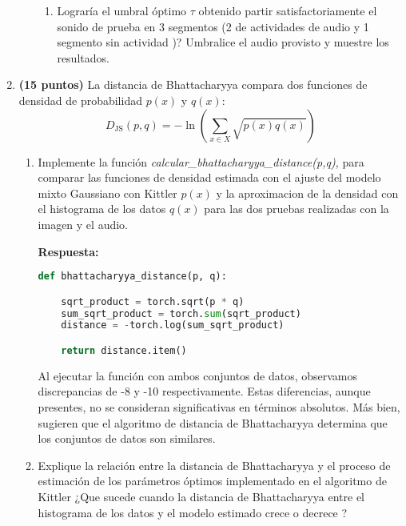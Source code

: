 \documentclass[spanish]{article}
\begin{document}
\begin{enumerate}
\begin{enumerate}
\begin{enumerate}
\item Lograría el umbral óptimo $\tau$ obtenido partir satisfactoriamente
el sonido de prueba en 3 segmentos (2 de actividades de audio y 1
segmento sin actividad )? Umbralice el audio provisto y muestre los
resultados.
\end{enumerate}
\end{enumerate}
\newpage
\item \textbf{(15 puntos)} La distancia de Bhattacharyya compara dos funciones
de densidad de probabilidad $p\left(x\right)$ y $q\left(x\right)$:
\[
D_{\textrm{JS}}\left(p,q\right)=-\ln\left(\sum_{x\in X}\sqrt{p\left(x\right)q\left(x\right)}\right)
\]

\begin{enumerate}
\item Implemente la función \emph{calcular\_bhattacharyya\_distance(p,q),
}para comparar\emph{ }las funciones de densidad estimada con el ajuste
del modelo mixto Gaussiano con Kittler $p\left(x\right)$ y la aproximacion
de la densidad con el histograma de los datos $q\left(x\right)$ para
las dos pruebas realizadas con la imagen y el audio. 

\vspace{5px}

\par \textbf{Respuesta:}

\vspace{5px}


\begin{lstlisting}[language=Python, caption=distancia de Bhattacharyya]
def bhattacharyya_distance(p, q):

    sqrt_product = torch.sqrt(p * q)
    sum_sqrt_product = torch.sum(sqrt_product)
    distance = -torch.log(sum_sqrt_product)

    return distance.item()
\end{lstlisting}

\par Al ejecutar la función con ambos conjuntos de datos, observamos discrepancias de -8 y -10 respectivamente. Estas diferencias, aunque presentes, no se consideran significativas en términos absolutos. Más bien, sugieren que el algoritmo de distancia de Bhattacharyya determina que los conjuntos de datos son similares.

\item Explique la relación entre la distancia de Bhattacharyya y el proceso
de estimación de los parámetros óptimos implementado en el algoritmo
de Kittler ¿Que sucede cuando la distancia de Bhattacharyya entre
el histograma de los datos y el modelo estimado crece o decrece ?


\end{enumerate}
\end{enumerate}
\end{document}
